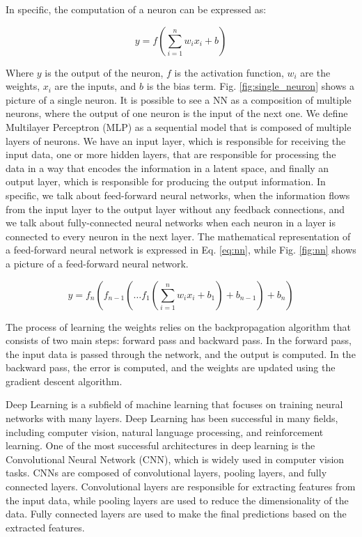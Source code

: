 In specific, the computation of a neuron can be expressed as:

\begin{equation}
    y = f(\sum_{i=1}^{n} w_i x_i + b)\label{eq:neuron}
\end{equation}

Where $y$ is the output of the neuron, $f$ is the activation function, $w_i$ are the weights, $x_i$ are the inputs, and $b$ is the bias term.
Fig. \ref{fig:single_neuron} shows a picture of a single neuron.
It is possible to see a NN as a composition of multiple neurons, where the output of one neuron is the input of the next one.
We define Multilayer Perceptron (MLP) as a sequential model that is composed of multiple layers of neurons.
We have an input layer, which is responsible for receiving the input data, one or more hidden layers, that are responsible for processing the data in a way that encodes the information in a latent space, and finally an output layer, which is responsible for producing the output information.
In specific, we talk about feed-forward neural networks, when the information flows from the input layer to the output layer without any feedback connections, and we talk about fully-connected neural networks when each neuron in a layer is connected to every neuron in the next layer.
The mathematical representation of a feed-forward neural network is expressed in Eq. \ref{eq:nn}, while Fig. \ref{fig:nn} shows a picture of a feed-forward neural network.

\begin{equation}
    y = f_n(f_{n-1}(\dots f_1(\sum_{i=1}^{n} w_i x_i + b_1) + b_{n-1}) + b_n)\label{eq:nn}
\end{equation}


The process of learning the weights relies on the backpropagation algorithm that consists of two main steps: forward pass and backward pass.
In the forward pass, the input data is passed through the network, and the output is computed.
In the backward pass, the error is computed, and the weights are updated using the gradient descent algorithm.


Deep Learning is a subfield of machine learning that focuses on training neural networks with many layers.
Deep Learning has been successful in many fields, including computer vision, natural language processing, and reinforcement learning.
One of the most successful architectures in deep learning is the Convolutional Neural Network (CNN), which is widely used in computer vision tasks.
CNNs are composed of convolutional layers, pooling layers, and fully connected layers.
Convolutional layers are responsible for extracting features from the input data, while pooling layers are used to reduce the dimensionality of the data.
Fully connected layers are used to make the final predictions based on the extracted features.


